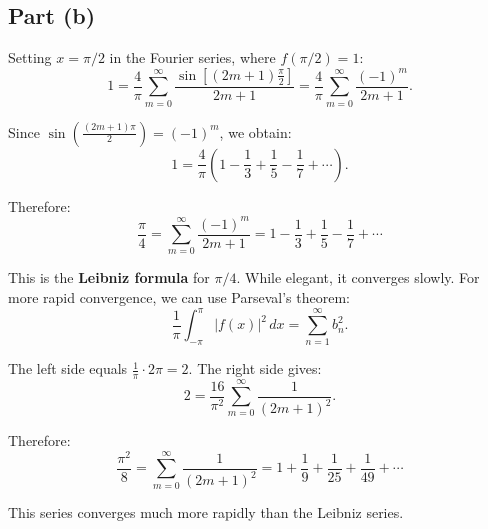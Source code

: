\documentclass[12pt]{article}
\begin{document}
\subsection*{Part (b)}

Setting $x = \pi/2$ in the Fourier series, where $f(\pi/2) = 1$:
\[
1 = \frac{4}{\pi}\sum_{m=0}^{\infty} \frac{\sin\left[(2m+1)\frac{\pi}{2}\right]}{2m+1} = \frac{4}{\pi}\sum_{m=0}^{\infty} \frac{(-1)^m}{2m+1}.
\]

Since $\sin\left(\frac{(2m+1)\pi}{2}\right) = (-1)^m$, we obtain:
\[
1 = \frac{4}{\pi}\left(1 - \frac{1}{3} + \frac{1}{5} - \frac{1}{7} + \cdots\right).
\]

Therefore:
\[
\boxed{\frac{\pi}{4} = \sum_{m=0}^{\infty}\frac{(-1)^m}{2m+1} = 1 - \frac{1}{3} + \frac{1}{5} - \frac{1}{7} + \cdots}
\]

This is the \textbf{Leibniz formula} for $\pi/4$. While elegant, it converges slowly. For more rapid convergence, we can use Parseval's theorem:
\[
\frac{1}{\pi}\int_{-\pi}^{\pi}|f(x)|^2\,dx = \sum_{n=1}^{\infty} b_n^2.
\]

The left side equals $\frac{1}{\pi}\cdot 2\pi = 2$. The right side gives:
\[
2 = \frac{16}{\pi^2}\sum_{m=0}^{\infty}\frac{1}{(2m+1)^2}.
\]

Therefore:
\[
\boxed{\frac{\pi^2}{8} = \sum_{m=0}^{\infty}\frac{1}{(2m+1)^2} = 1 + \frac{1}{9} + \frac{1}{25} + \frac{1}{49} + \cdots}
\]

This series converges much more rapidly than the Leibniz series.
\end{document}
